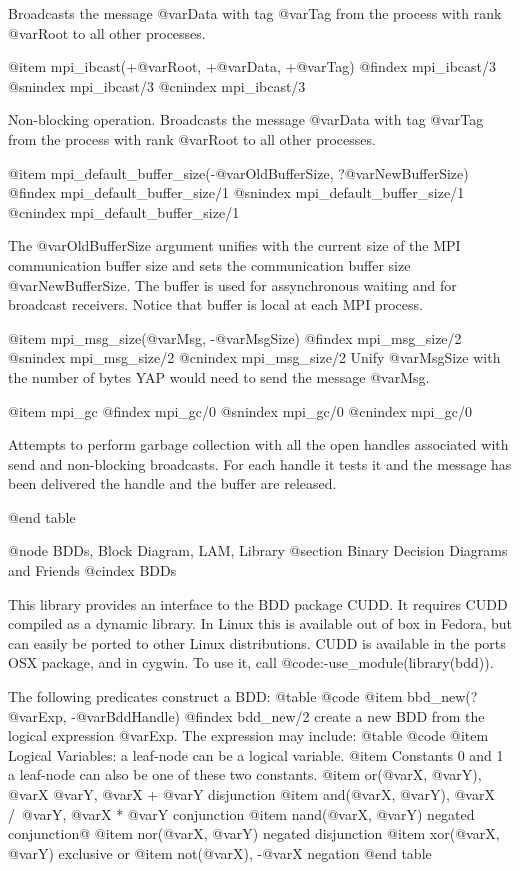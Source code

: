 Broadcasts the message @var{Data} with tag @var{Tag} from the process with rank @var{Root}
to all other processes.

@item mpi_ibcast(+@var{Root}, +@var{Data}, +@var{Tag})
@findex mpi_ibcast/3
@snindex mpi_ibcast/3
@cnindex mpi_ibcast/3

Non-blocking operation. Broadcasts the message @var{Data} with tag @var{Tag}
from the process with rank @var{Root} to all other processes.

@item mpi_default_buffer_size(-@var{OldBufferSize}, ?@var{NewBufferSize})
@findex mpi_default_buffer_size/1
@snindex mpi_default_buffer_size/1
@cnindex mpi_default_buffer_size/1

The @var{OldBufferSize} argument unifies with the current size of the
MPI communication buffer size and sets the communication buffer size
@var{NewBufferSize}. The buffer is used for assynchronous waiting and
for broadcast receivers. Notice that buffer is local at each MPI
process.


@item mpi_msg_size(@var{Msg}, -@var{MsgSize})
@findex mpi_msg_size/2
@snindex mpi_msg_size/2
@cnindex mpi_msg_size/2
Unify @var{MsgSize} with the number of bytes YAP would need to send the
message @var{Msg}.

@item mpi_gc
@findex mpi_gc/0
@snindex mpi_gc/0
@cnindex mpi_gc/0

Attempts to perform garbage collection with all the open handles
associated with send and non-blocking broadcasts. For each handle it
tests it and the message has been delivered the handle and the buffer
are released.

@end table

@node BDDs, Block Diagram, LAM, Library
@section Binary Decision Diagrams and Friends
@cindex BDDs

This library provides an interface to the BDD package CUDD. It requires
CUDD compiled as a dynamic library. In Linux this is available out of
box in Fedora, but can easily be ported to other Linux
distributions. CUDD is available in the ports OSX package, and in
cygwin. To use it, call @code{:-use_module(library(bdd))}.

The following predicates construct a BDD:
@table @code
@item bbd_new(?@var{Exp}, -@var{BddHandle})
@findex bdd_new/2
create a new BDD from the logical expression @var{Exp}. The expression
may include:
@table @code
@item  Logical Variables:
a leaf-node can be a logical variable.
@item Constants 0 and 1
a leaf-node can also be one of these two constants.
@item or(@var{X}, @var{Y}), @var{X} \/ @var{Y}, @var{X} + @var{Y}
disjunction
@item and(@var{X}, @var{Y}), @var{X} /\ @var{Y}, @var{X} * @var{Y}
conjunction
@item nand(@var{X}, @var{Y})
negated conjunction@
@item nor(@var{X}, @var{Y})
negated disjunction
@item xor(@var{X}, @var{Y})
exclusive or
@item not(@var{X}), -@var{X}
negation
@end table

